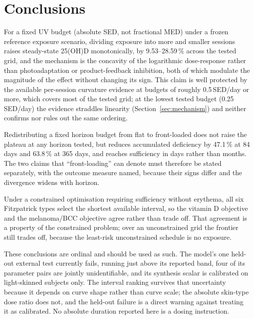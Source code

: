 \documentclass[11pt]{article}
\begin{document}
\section{Conclusions}

For a fixed UV budget (absolute SED, not fractional MED) under a
frozen reference exposure scenario, dividing exposure into more and
smaller sessions raises steady-state 25(OH)D monotonically, by
9.53--28.59\,\% across the tested grid, and the mechanism is the
concavity of the logarithmic dose-response rather than photoadaptation
or product-feedback inhibition, both of which modulate the magnitude
of the effect without changing its sign. This claim is well protected
by the available per-session curvature evidence at budgets of roughly
0.5\,SED/day or more, which covers most of the tested grid; at the
lowest tested budget (0.25\,SED/day) the evidence straddles linearity
(Section~\ref{sec:mechanism}) and neither confirms nor rules out the
same ordering.

Redistributing a fixed horizon budget from flat to front-loaded does
not raise the plateau at any horizon tested, but reduces accumulated
deficiency by 47.1\,\% at 84 days and 63.8\,\% at 365 days, and
reaches sufficiency in days rather than months. The two claims that
``front-loading'' can denote must therefore be stated separately, with
the outcome measure named, because their signs differ and the
divergence widens with horizon.

Under a constrained optimisation requiring sufficiency without
erythema, all six Fitzpatrick types select the shortest available
interval, so the vitamin D objective and the melanoma/BCC objective
agree rather than trade off. That agreement is a property of the
constrained problem; over an unconstrained grid the frontier still
trades off, because the least-risk unconstrained schedule is no
exposure.

These conclusions are ordinal and should be used as such. The model's
one held-out external test currently fails, running just above its
reported band, four of its parameter pairs are jointly unidentifiable,
and its synthesis scalar is calibrated on light-skinned subjects only.
The interval ranking survives that uncertainty because it depends on
curve shape rather than curve scale; the absolute skin-type dose ratio
does not, and the held-out failure is a direct warning against
treating it as calibrated. No absolute duration reported here is a
dosing instruction.
\end{document}
